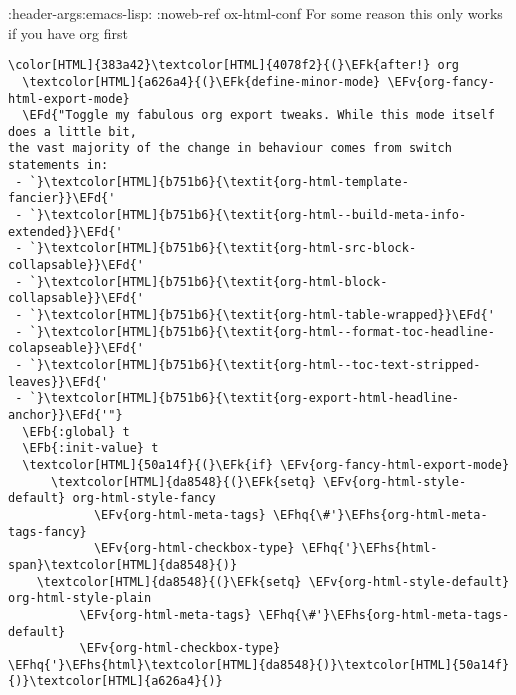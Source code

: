 \documentclass{scrartcl}
\newcommand{\EFk}[1]{\textcolor{EFk}{#1}} %
\newcommand{\EFd}[1]{\textcolor{EFd}{\textit{#1}}} %
\newcommand{\EFb}[1]{\textcolor{EFb}{#1}} %
\newcommand{\EFv}[1]{\textcolor{EFv}{#1}} %
\newcommand{\EFhq}[1]{\textcolor{EFhq}{#1}} %
\newcommand{\EFhs}[1]{\textcolor{EFhs}{#1}} %
\begin{document}
:header-args:emacs-lisp: :noweb-ref ox-html-conf
For some reason this only works if you have org first
\begin{Code}
\begin{Verbatim}[]
\color[HTML]{383a42}\textcolor[HTML]{4078f2}{(}\EFk{after!} org
  \textcolor[HTML]{a626a4}{(}\EFk{define-minor-mode} \EFv{org-fancy-html-export-mode}
  \EFd{"Toggle my fabulous org export tweaks. While this mode itself does a little bit,
the vast majority of the change in behaviour comes from switch statements in:
 - `}\textcolor[HTML]{b751b6}{\textit{org-html-template-fancier}}\EFd{'
 - `}\textcolor[HTML]{b751b6}{\textit{org-html--build-meta-info-extended}}\EFd{'
 - `}\textcolor[HTML]{b751b6}{\textit{org-html-src-block-collapsable}}\EFd{'
 - `}\textcolor[HTML]{b751b6}{\textit{org-html-block-collapsable}}\EFd{'
 - `}\textcolor[HTML]{b751b6}{\textit{org-html-table-wrapped}}\EFd{'
 - `}\textcolor[HTML]{b751b6}{\textit{org-html--format-toc-headline-colapseable}}\EFd{'
 - `}\textcolor[HTML]{b751b6}{\textit{org-html--toc-text-stripped-leaves}}\EFd{'
 - `}\textcolor[HTML]{b751b6}{\textit{org-export-html-headline-anchor}}\EFd{'"}
  \EFb{:global} t
  \EFb{:init-value} t
  \textcolor[HTML]{50a14f}{(}\EFk{if} \EFv{org-fancy-html-export-mode}
      \textcolor[HTML]{da8548}{(}\EFk{setq} \EFv{org-html-style-default} org-html-style-fancy
            \EFv{org-html-meta-tags} \EFhq{\#'}\EFhs{org-html-meta-tags-fancy}
            \EFv{org-html-checkbox-type} \EFhq{'}\EFhs{html-span}\textcolor[HTML]{da8548}{)}
    \textcolor[HTML]{da8548}{(}\EFk{setq} \EFv{org-html-style-default} org-html-style-plain
          \EFv{org-html-meta-tags} \EFhq{\#'}\EFhs{org-html-meta-tags-default}
          \EFv{org-html-checkbox-type} \EFhq{'}\EFhs{html}\textcolor[HTML]{da8548}{)}\textcolor[HTML]{50a14f}{)}\textcolor[HTML]{a626a4}{)}


\end{Verbatim}
\end{Code}
\end{document}
